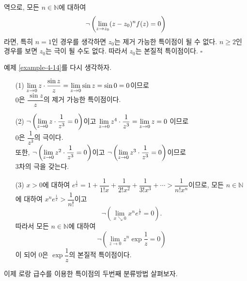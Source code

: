 역으로, 모든 $n\in\mathbb N$에 대하여
\[
 \neg\left( \lim\limits_{z\to z_0} (z-z_0)^{n} f(z) = 0 \right)
\]
라면, 특히 $n=1$인 경우를 생각하면 $z_0$는 제거 가능한 특이점이 될 수 없다.
$n\ge2$인 경우를 보면 $z_0$는 극이 될 수도 없다.
따라서 $z_0$는 본질적 특이점이다. \hfill $\square$

예제 \ref{example-4-14}를 다시 생각하자.

\begin{saltexample}[label=example-4-15]{}{}

\begin{itemize}
\item[(1)] $\lim\limits_{z\to0} z \cdot \displaystyle\frac{\sin z}z = \lim\limits_{z\to0} \sin z 
= \sin 0 = 0$이므로 \\[1ex]
$0$은 $\dfrac{\sin z}z$의 제거 가능한 특이점이다.
\item[(2)] $\neg\left(\lim\limits_{z\to 0} z\cdot \displaystyle\frac1{z^3} = 0 \right)$이고
$\lim\limits_{z\to 0} z^4 \cdot \displaystyle\frac1{z^3} = \lim\limits_{z\to0} z = 0$ 이므로 \\[1ex]
$0$은 $\dfrac1{z^3}$의 극이다. \\[1ex]
또한,
$\neg\left(\lim\limits_{z\to 0} z^2\cdot \displaystyle\frac1{z^3} = 0 \right)$이고
$\neg\left(\lim\limits_{z\to 0} z^3\cdot \displaystyle\frac1{z^3} = 0 \right)$이므로 \\[1ex]
$3$차의 극을 갖는다.
\item[(3)] $x>0$에 대하여
$e^{\frac1x} = 1 + \dfrac1{1!x} + \dfrac1{2!x^2} + \dfrac1{3!x^3} + \cdots
> \dfrac1{n!x^n}$이므로,
모든 $n\in\mathbb N$에 대하여 $x^ne^{\frac1x} > \dfrac1{n!}$이고
\[
\neg\left(\lim_{x\searrow 0} x^ne^{\frac1x} = 0 \right). 
\]
따라서  모든 $n\in\mathbb N$에 대하여
\[
\neg\left(\lim_{z\to 0} z^n\exp \frac1z = 0 \right)
\]
이 되어 $0$은 $\exp \dfrac 1z$의 본질적 특이점이다. 
\end{itemize}
\end{saltexample}


이제 로랑 급수를 이용한 특이점의 두번째 분류방법 살펴보자.


